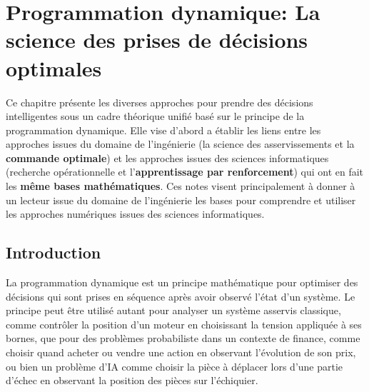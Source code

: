 \chapter{Programmation dynamique: La science des prises de décisions optimales}
\label{sec:decision}





Ce chapitre présente les diverses approches pour prendre des décisions intelligentes sous un cadre théorique unifié basé sur le principe de la programmation dynamique. Elle vise d'abord a établir les liens entre les approches issues du domaine de l'ingénierie (la science des asservissements et la \textbf{commande optimale}) et les approches issues des sciences informatiques (recherche opérationnelle et l'\textbf{apprentissage par renforcement}) qui ont en fait les \textbf{même bases mathématiques}. Ces notes visent principalement à donner à un lecteur issue du domaine de l'ingénierie les bases pour comprendre et utiliser les approches numériques issues des sciences informatiques. 




\section{Introduction}
La programmation dynamique est un principe mathématique pour optimiser des décisions qui sont prises en séquence après avoir observé l'état d'un système. Le principe peut être utilisé autant pour analyser un système asservis classique, comme contrôler la position d'un moteur en choisissant la tension appliquée à ses bornes, que pour des problèmes probabiliste dans un contexte de finance, comme choisir quand acheter ou vendre une action en observant l'évolution de son prix, ou bien un problème d'IA comme choisir la pièce à déplacer lors d'une partie d'échec en observant la position des pièces sur l'échiquier.

